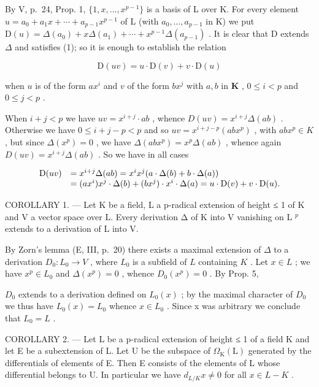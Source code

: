 By V, p.~24, Prop. 1, \(\{1, x, \ldots, x^{p-1}\}\) is a basis of L over K. For every element \(u = a_{0} + a_{1}x + \cdots + a_{p-1}x^{p-1}\) of L (with \(a_{0}, \ldots, a_{p-1}\) in K) we put \(\mathrm{D}(u) = \Delta(a_{0}) + x\Delta(a_{1}) + \cdots + x^{p-1}\Delta(a_{p-1})\) . It is clear that D extends \(\Delta\) and satisfies (1); so it is enough to establish the relation

\[
\mathrm{D} (u v) = u \cdot \mathrm{D} (v) + v \cdot \mathrm{D} (u)
\]

when \(u\) is of the form \(ax^i\) and \(v\) of the form \(bx^j\) with \(a, b\) in \(\mathbf{K}\) , \(0 \leqslant i < p\) and \(0 \leqslant j < p\) .

When \(i + j < p\) we have \(uv = x^{i + j} \cdot ab\) , whence \(D(uv) = x^{i + j}\Delta(ab)\) . Otherwise we have \(0 \leqslant i + j - p < p\) and so \(uv = x^{i + j - p}(abx^p)\) , with \(abx^p \in K\) , but since \(\Delta(x^p) = 0\) , we have \(\Delta(abx^p) = x^p\Delta(ab)\) , whence again \(D(uv) = x^{i + j}\Delta(ab)\) . So we have in all cases

\[
\begin{array}{r l} \mathrm{D} (u v) & = x ^ {i + j} \Delta (a b) = x ^ {i} x ^ {j} (a \cdot \Delta (b) + b \cdot \Delta (a)) \\ & = (a x ^ {i}) x ^ {j} \cdot \Delta (b) + (b x ^ {j}) \cdot x ^ {i} \cdot \Delta (a) = u \cdot \mathrm{D} (v) + v \cdot \mathrm{D} (u). \end{array}
\]

COROLLARY 1. --- Let K be a field, L a p-radical extension of height ≤ 1 of K and V a vector space over L. Every derivation Δ of K into V vanishing on L \(^{p}\) extends to a derivation of L into V.

By Zorn's lemma (E, III, p.~20) there exists a maximal extension of \(\Delta\) to a derivation \(D_0: L_0 \to V\) , where \(L_0\) is a subfield of \(L\) containing \(K\) . Let \(x \in L\) ; we have \(x^p \in L_0\) and \(\Delta(x^p) = 0\) , whence \(D_0(x^p) = 0\) . By Prop. 5,

\(D_{0}\) extends to a derivation defined on \(L_{0}(x)\) ; by the maximal character of \(D_{0}\) we thus have \(L_{0}(x) = L_{0}\) whence \(x \in L_{0}\) . Since x was arbitrary we conclude that \(L_{0} = L\) .

COROLLARY 2. --- Let L be a p-radical extension of height ≤ 1 of a field K and let E be a subextension of L. Let U be the subspace of \(\Omega_{\mathrm{K}}(\mathrm{L})\) generated by the differentials of elements of E. Then E consists of the elements of L whose differential belongs to U. In particular we have \(d_{L/K}x \neq 0\) for all \(x \in L - K\) .

